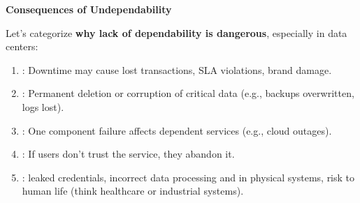 \highspace
\begin{flushleft}
    \textcolor{Red2}{ \textbf{Consequences of Undependability}}
\end{flushleft}
Let's categorize \textbf{why lack of dependability is dangerous}, especially in data centers:
\begin{enumerate}
    \item {}: Downtime may cause lost transactions, SLA violations, brand damage.
    \item {}: Permanent deletion or corruption of critical data (e.g., backups overwritten, logs lost).
    \item {}: One component failure affects dependent services (e.g., cloud outages).
    \item {}: If users don't trust the service, they abandon it.
    \item {}: leaked credentials, incorrect data processing and in physical systems, risk to human life (think healthcare or industrial systems).
\end{enumerate}

